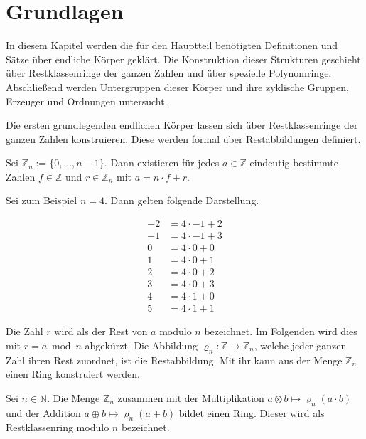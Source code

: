 \section{Grundlagen}

In diesem Kapitel werden die für den Hauptteil benötigten Definitionen und Sätze über endliche Körper geklärt. Die Konstruktion dieser Strukturen geschieht über Restklassenringe der ganzen Zahlen und über spezielle Polynomringe. Abschließend werden Untergruppen dieser Körper und ihre zyklische Gruppen, Erzeuger und Ordnungen untersucht.

Die ersten grundlegenden endlichen Körper lassen sich über Restklassenringe der ganzen Zahlen konstruieren. Diese werden formal über Restabbildungen definiert.

\begin{satz}
    Sei $\mathbb{Z}_n := \{0,\dots,n-1\}$. Dann existieren für jedes $a \in \mathbb{Z}$ eindeutig bestimmte Zahlen $f \in \mathbb{Z}$ und $r \in \mathbb{Z}_n$ mit $a = n \cdot f + r$.
\end{satz}

Sei zum Beispiel $n = 4$. Dann gelten folgende Darstellung.

\begin{align*}
    -2 &= 4 \cdot -1 + 2 \\
    -1 &= 4 \cdot -1 + 3 \\
    0 &= 4 \cdot 0 + 0 \\
    1 &= 4 \cdot 0 + 1 \\
    2 &= 4 \cdot 0 + 2 \\
    3 &= 4 \cdot 0 + 3 \\
    4 &= 4 \cdot 1 + 0 \\
    5 &= 4 \cdot 1 + 1
\end{align*}

Die Zahl $r$ wird als der Rest von $a$ modulo $n$ bezeichnet. Im Folgenden wird dies mit $r = a \bmod n$ abgekürzt. Die Abbildung $\varrho_n : \mathbb{Z} \rightarrow \mathbb{Z}_n$, welche jeder ganzen Zahl ihren Rest zuordnet, ist die Restabbildung. Mit ihr kann aus der Menge $\mathbb{Z}_n$ einen Ring konstruiert werden.

\begin{satz}
    Sei $n \in \mathbb{N}$. Die Menge $\mathbb{Z}_n$ zusammen mit der Multiplikation $a \otimes b \mapsto \varrho_n(a \cdot b)$ und der Addition $a \oplus b \mapsto \varrho_n(a + b)$ bildet einen Ring. Dieser wird als Restklassenring modulo $n$ bezeichnet.
\end{satz}

